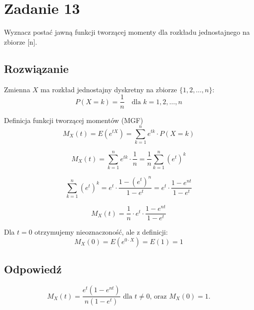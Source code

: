 \section{Zadanie 13}
Wyznacz postać jawną funkcji tworzącej momenty dla rozkładu jednostajnego na zbiorze [n].

\subsection*{Rozwiązanie}
Zmienna \(X\) ma rozkład jednostajny dyskretny na zbiorze \(\{1, 2, \dots, n\}\):
\[
	P(X = k) = \frac{1}{n} \quad \text{dla } k = 1, 2, \dots, n
\]

Definicja funkcji tworzącej momentów (MGF)
\[
	M_X(t) = E(e^{tX}) = \sum_{k=1}^n e^{tk} \cdot P(X = k)
\]


\[
	M_X(t) = \sum_{k=1}^n e^{tk} \cdot \frac{1}{n} = \frac{1}{n} \sum_{k=1}^n (e^t)^k
\]


\[
	\sum_{k=1}^n (e^t)^k = e^t \cdot \frac{1 - (e^t)^n}{1 - e^t} = e^t \cdot \frac{1 - e^{nt}}{1 - e^t}
\]

\[
	M_X(t) = \frac{1}{n} \cdot e^t \cdot \frac{1 - e^{nt}}{1 - e^t}
\]

Dla \(t = 0\) otrzymujemy nieoznaczoność, ale z definicji:
\[
	M_X(0) = E(e^{0 \cdot X}) = E(1) = 1
\]



\subsection*{Odpowiedź}
\[
	\boxed{M_X(t) = \frac{e^t (1 - e^{nt})}{n(1 - e^t)}
		\text{ dla } t \neq 0 \text{, oraz } M_X(0) = 1.}
\]
